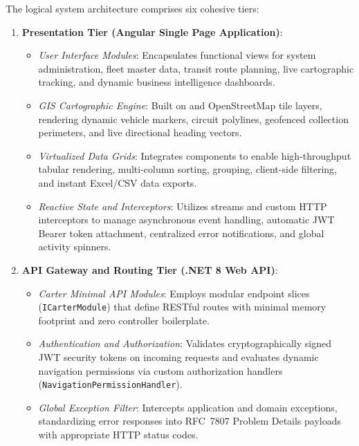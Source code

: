The logical system architecture comprises six cohesive tiers:
\begin{enumerate}
  \item \textbf{Presentation Tier (Angular Single Page Application)}:
  \begin{itemize}
    \item \emph{User Interface Modules}: Encapsulates functional views for system administration, fleet master data, transit route planning, live cartographic tracking, and dynamic business intelligence dashboards.
    \item \emph{GIS Cartographic Engine}: Built on  and OpenStreetMap tile layers, rendering dynamic vehicle markers, circuit polylines, geofenced collection perimeters, and live directional heading vectors.
    \item \emph{Virtualized Data Grids}: Integrates  components to enable high-throughput tabular rendering, multi-column sorting, grouping, client-side filtering, and instant Excel/CSV data exports.
    \item \emph{Reactive State and Interceptors}: Utilizes  streams and custom HTTP interceptors to manage asynchronous event handling, automatic JWT Bearer token attachment, centralized error notifications, and global activity spinners.
  \end{itemize}

  \item \textbf{API Gateway and Routing Tier (.NET 8 Web API)}:
  \begin{itemize}
    \item \emph{Carter Minimal API Modules}: Employs modular endpoint slices (\texttt{ICarterModule}) that define RESTful routes with minimal memory footprint and zero controller boilerplate.
    \item \emph{Authentication and Authorization}: Validates cryptographically signed JWT security tokens on incoming requests and evaluates dynamic navigation permissions via custom authorization handlers (\texttt{NavigationPermissionHandler}).
    \item \emph{Global Exception Filter}: Intercepts application and domain exceptions, standardizing error responses into RFC~7807 Problem Details payloads with appropriate HTTP status codes.
  \end{itemize}


\end{enumerate}
